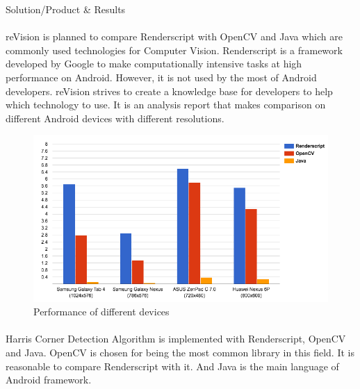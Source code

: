 \documentclass[12pt, a4paper]{article} \pagenumbering{gobble}
\begin{document}
\newpage
\begin{section}{Solution/Product \& Results}

  \paragraph{}{
    reVision is planned to compare Renderscript with OpenCV and Java which are commonly used technologies for Computer
    Vision. Renderscript is a framework developed by Google to make computationally intensive tasks at high performance
    on Android. However, it is not used by the most of Android developers. reVision strives to create a knowledge base
    for developers to help which technology to use. It is an analysis report that makes comparison on different
    Android devices with different resolutions.
  }

  \begin{figure}[h]
    \centering
    \includegraphics[scale=0.60]{graph.png}

    \caption{Performance of different devices}
    \label{fig:mesh1}
  \end{figure}

  \paragraph{}{
    Harris Corner Detection Algorithm is implemented with Renderscript, OpenCV and Java. OpenCV is chosen for being
    the most common library in this field. It is reasonable to compare Renderscript with it. And Java is the main
    language of Android framework.
  }
  \newpage

\paragraph{}{

}
\end{section}
\end{document}
